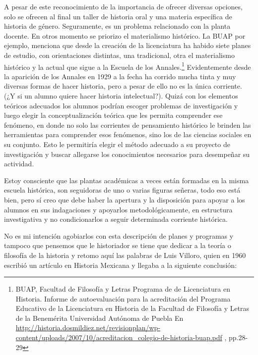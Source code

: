 A pesar de este reconocimiento de la importancia de ofrecer diversas 
opciones, solo se ofrecen al final un taller de historia oral y una 
materia específica de historia de género. Seguramente, es un problema 
relacionado con la planta docente. En otros momento se priorizo el 
materialismo histórico. La BUAP por ejemplo, menciona que desde la 
creación de la licenciatura ha habido siete planes de estudio, con 
orientaciones distintas, una tradicional, otra el materialismo 
histórico y la actual que sigue a la Escuela de los Annales.\footnote{ 
BUAP, Facultad de Filosofía y Letras Programa de de Licenciatura en 
Historia. Informe de autoevaluación para la acreditación del Programa 
Educativo de la Licenciatura en Historia de la Facultad de Filosofía y 
Letras de la  Benemérita Universidad Autónoma de Puebla  En 
\url{http://historia.dosmildiez.net/revisionplan/wp-content/uploads/2007/10/acreditacion_colegio-de-historia-buap.pdf} 
, pp.28-29} Evidentemente desde la aparición de los Annales en 1929 a 
la fecha ha corrido mucha tinta y muy diversas formas de hacer 
historia, pero a pesar de ello no es la única corriente. (¿Y si un 
alumno quiere hacer historia intelectual?). Quizá con los elementos 
teóricos adecuados los alumnos podrían escoger problemas de 
investigación y luego elegir la conceptualización teórica que les 
permita comprender ese fenómeno, en donde no solo las corrientes de 
pensamiento histórico le brinden las herramientas para comprender esos 
fenómenos, sino los de las ciencias sociales en su conjunto. Esto le 
permitiría elegir el método adecuado a su proyecto de investigación y 
buscar allegarse los conocimientos necesarios para desempeñar su 
actividad. 

Estoy consciente que las plantas académicas a veces están formadas en la
misma escuela histórica, son seguidoras de uno o varias figuras señeras,
todo eso está bien, pero sí creo que debe haber la apertura y la
disposición para apoyar a los alumnos en sus indagaciones y apoyarlos
metodológicamente, en estructura investigativa y no condicionarlos a seguir
determinada corriente histórica. 

No es mi intención agobiarlos con esta descripción de planes y programas y
tampoco que pensemos que le historiador se tiene que dedicar a la teoría o
filosofía de la historia y retomo aquí las palabras de Luis Villoro, quien
en 1960 escribió un artículo en Historia Mexicana y llegaba a la siguiente
conclusión: 

